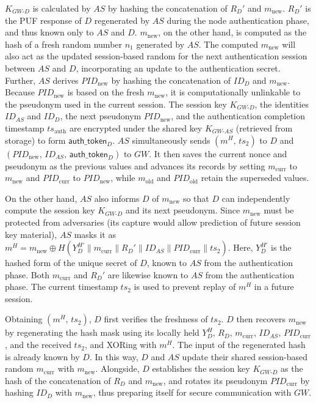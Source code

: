 \documentclass[conference]{IEEEtran}
\begin{document}
$K_{GW\text{-}D}$ is calculated by $AS$ by hashing the concatenation of $R_D'$ and
$m_{\mathrm{new}}$.
$R_D'$ is the PUF response of $D$ regenerated by $AS$ during the node
authentication phase, and thus known only to $AS$ and $D$.  $m_{\mathrm{new}}$,
on the other hand, is computed as the hash of a fresh random number $n_1$ generated
by $AS$.  The computed $m_{\mathrm{new}}$ will
also act as the updated session-based random for the next authentication session
between $AS$ and $D$, incorporating an update to the authentication secret.
Further, $AS$ derives $\mathit{PID}_{\mathrm{new}}$ by hashing the concatenation of $ID_D$ and $m_{\mathrm{new}}$.
Because $\mathit{PID}_{\mathrm{new}}$ is based on the fresh $m_{\mathrm{new}}$,
it is computationally unlinkable to the pseudonym used in the current session.
The session key $K_{GW\text{-}D}$, the identities $ID_{AS}$ and $ID_D$, the
next pseudonym $\mathit{PID}_{\mathrm{new}}$, and the authentication completion
timestamp $ts_{\mathrm{auth}}$ are encrypted under the shared key $K_{GW\text{-}AS}$
(retrieved from storage) to form $\mathsf{auth\_token}_D$.  $AS$ simultaneously
sends $(m^H,\, ts_2)$ to $D$ and $(\mathit{PID}_{\mathrm{new}},\, ID_{AS},\, \mathsf{auth\_token}_D)$ to $GW$.
It then saves the current nonce and pseudonym as the previous values and advances
its records by setting $m_{\mathrm{curr}}$ to $m_{\mathrm{new}}$
and $\mathit{PID}_{\mathrm{curr}}$ to $\mathit{PID}_{\mathrm{new}}$, while
$m_{\mathrm{old}}$ and $\mathit{PID}_{\mathrm{old}}$ retain the superseded values.

On the other hand, $AS$ also informs $D$ of $m_{\mathrm{new}}$ so that $D$
can independently compute the session key $K_{GW\text{-}D}$ and its next
pseudonym.  Since $m_{\mathrm{new}}$ must be protected from adversaries (its
capture would allow prediction of future session key material), $AS$ masks it as
$m^H = m_{\mathrm{new}} \oplus H(Y_D^{H'} \| m_{\mathrm{curr}} \| R_D' \| ID_{AS} \| \mathit{PID}_{\mathrm{curr}} \| ts_2)$.
Here, $Y_D^{H'}$ is the hashed form of the unique secret of $D$, known to $AS$
from the authentication phase.  Both $m_{\mathrm{curr}}$ and $R_D'$ are likewise
known to $AS$ from the authentication phase.  The current timestamp $ts_2$ is
used to prevent replay of $m^H$ in a future session.

Obtaining $(m^H,\, ts_2)$, $D$ first verifies the freshness of $ts_2$.  $D$
then recovers $m_{\mathrm{new}}$ by regenerating the hash mask using its locally
held $Y_D^H$, $R_D$, $m_{\mathrm{curr}}$, $ID_{AS}$, $\mathit{PID}_{\mathrm{curr}}$, and the
received $ts_2$, and XORing with $m^H$.  The input of the regenerated hash is
already known by $D$.  In this way, $D$ and $AS$ update their shared
session-based random $m_{\mathrm{curr}}$ with $m_{\mathrm{new}}$.  Alongside,
$D$ establishes the session key $K_{GW\text{-}D}$ as the hash of the concatenation of $R_D$ and $m_{\mathrm{new}}$,
and rotates its pseudonym $\mathit{PID}_{\mathrm{curr}}$ by hashing $ID_D$ with $m_{\mathrm{new}}$,
thus preparing itself for secure communication with $GW$.
\end{document}
